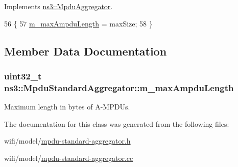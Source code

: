 Implements \hyperlink{classns3_1_1MpduAggregator_a00344d9ef60b8ad4368769b31761f55d}{ns3\+::\+Mpdu\+Aggregator}.


\begin{DoxyCode}
56 \{
57   \hyperlink{classns3_1_1MpduStandardAggregator_afe4089ec8e77ce0a35c92803131ffc5f}{m\_maxAmpduLength} = maxSize;
58 \}
\end{DoxyCode}


\subsection{Member Data Documentation}
\subsubsection[{\texorpdfstring{m\+\_\+max\+Ampdu\+Length}{m_maxAmpduLength}}]{\setlength{\rightskip}{0pt plus 5cm}uint32\+\_\+t ns3\+::\+Mpdu\+Standard\+Aggregator\+::m\+\_\+max\+Ampdu\+Length\hspace{0.3cm}{\ttfamily [private]}}\hypertarget{classns3_1_1MpduStandardAggregator_afe4089ec8e77ce0a35c92803131ffc5f}{}\label{classns3_1_1MpduStandardAggregator_afe4089ec8e77ce0a35c92803131ffc5f}


Maximum length in bytes of A-\/\+M\+P\+D\+Us. 



The documentation for this class was generated from the following files\+:\begin{DoxyCompactItemize}
\item 
wifi/model/\hyperlink{mpdu-standard-aggregator_8h}{mpdu-\/standard-\/aggregator.\+h}\item 
wifi/model/\hyperlink{mpdu-standard-aggregator_8cc}{mpdu-\/standard-\/aggregator.\+cc}\end{DoxyCompactItemize}
